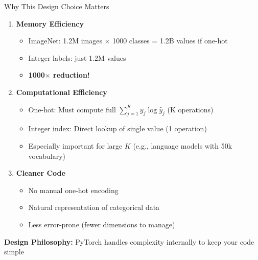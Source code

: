 \documentclass[xcolor=svgnames, 8pt, handout, standalone]{beamer}
\newcommand{\1}{\mathbf{1}}
\begin{document}
\begin{frame}{Why This Design Choice Matters}
\begin{enumerate}
\item<1-> \textbf{Memory Efficiency}
\begin{itemize}
\item ImageNet: 1.2M images $\times$ 1000 classes = 1.2B values if one-hot
\item Integer labels: just 1.2M values
\item \textcolor{deepgreen}{\textbf{1000$\times$ reduction!}}
\end{itemize}

\vspace{0.3em}
\item<2-> \textbf{Computational Efficiency}
\begin{itemize}
\item One-hot: Must compute full $\sum_{j=1}^K y_j \log \hat{y}_j$ (K operations)
\item Integer index: Direct lookup of single value (1 operation)
\item Especially important for large $K$ (e.g., language models with 50k vocabulary)
\end{itemize}

\vspace{0.3em}
\item<3-> \textbf{Cleaner Code}
\begin{itemize}
\item No manual one-hot encoding
\item Natural representation of categorical data
\item Less error-prone (fewer dimensions to manage)
\end{itemize}
\end{enumerate}

\begin{tcolorbox}[colback=lightblue, colframe=deepblue, boxrule=1pt]
\textbf{Design Philosophy:} PyTorch handles complexity internally to keep your code simple
\end{tcolorbox}
\end{frame}
\end{document}
